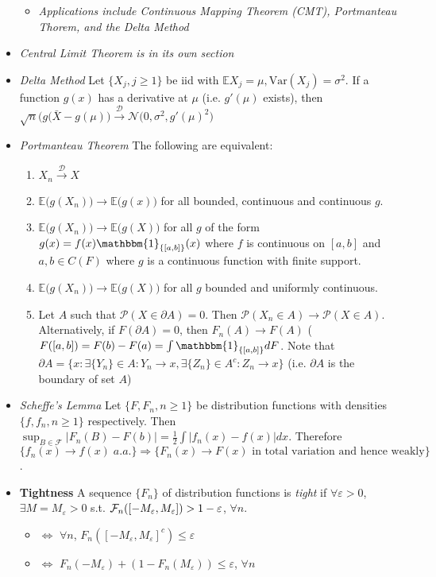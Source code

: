 \documentclass[11pt]{article}
\newcommand{\var}{\mrm{Var}}
\renewcommand{\P}{\mathbb{P}}
\newcommand{\fcal}{\mathcal{F}}
\newcommand{\ncal}{\mathcal{N}}
\newcommand{\F}{{\cal F}}
\newcommand{\eps}{\varepsilon}
\newcommand{\gs}{\sigma}
\newcommand{\mrm}{\mathrm}
\newcommand\abs[1]{\left|#1\right|}
\newcommand{\ind}[1]{\mathbbm{1}_{\{#1\}}}
\renewcommand{\to}{\longrightarrow}
\newcommand{\dto}{\overset{\mathcal{D}}{\to}}
\renewcommand{\P}{\mathcal{P}}
\newcommand{\E}{\mathbb{E}}
\newcommand{\bigpar}[1]{\big( #1 \big)}
\newcommand{\imp}{\Rightarrow}
\newcommand{\gm}{\mu}
\newcommand{\seq}[1]{\{#1\}}
\begin{document}
\begin{multicols}{2}
\begin{itemize}
\begin{itemize}
\item \textit{Applications include Continuous Mapping Theorem (CMT), Portmanteau Thorem, and the Delta Method}
\end{itemize}
\item \textit{Central Limit Theorem is in its own section}
\item \textit{Delta Method} Let $\seq{X_j, j \geq 1}$ be iid with $\E X_j =\gm, \var(X_j) =\gs^2$.  If a function $g(x)$ has a derivative at $\gm$ (i.e. $g'(\gm)$ exists), then $\sqrt{n}\big(g(\bar{X}-g(\gm)\big) \dto \ncal\big(0,\gs^2,g'(\gm)^2\big)$
\item \textit{Portmanteau Theorem} The following are equivalent:
\begin{enumerate}
\item $X_n \dto X$
\item $\E\big(g(X_n)\big) \to \E\big(g(x)\big)$ for all bounded, continuous and continuous $g$.
\item $\E \bigpar{g(X_n)} \to \E\bigpar{g(X)}$ for all $g$ of the form $g(x)=f(x)\ind{[a,b]}(x)$ where $f$ is continuous on $[a,b]$ and $a,b \in C(F)$ where $g$ is a continuous function with finite support.
\item $\E \bigpar{g(X_n)} \to \E \bigpar{g(X)}$ for all $g$ bounded and uniformly continuous.
\item Let $A$ such that $\P(X\in \partial A)=0$. Then $\P(X_n \in A) \to \P(X \in A)$.  Alternatively, if $F(\partial A)=0$, then $F_n(A) \to F(A)$ ($F([a,b])=F(b)-F(a)=\int \ind{[a,b]}dF$. Note that $\partial A=\seq{x: \exists \seq{Y_n} \in A: Y_n \to x, \exists \seq{Z_n}\in A^c: Z_n \to x}$ (i.e. $\partial A$ is the boundary of set $A$)
\end{enumerate}
\item \textit{Scheffe's Lemma} Let $\seq{F,F_n,n \geq 1}$ be distribution functions with densities $\seq{f,f_n,n \geq 1}$ respectively.  Then $\sup_{B \in \fcal} \abs{F_n(B)-F(b)}=\frac{1}{2}\int \abs{f_n(x)-f(x)} dx$.  Therefore $\seq{f_n(x) \to f(x) \; a.a.} \imp \seq{F_n(x) \to F(x) \textrm{ in total variation and hence weakly}}$. 
\item \textbf{Tightness} A sequence $\seq{F_n}$ of distribution functions is \textit{tight} if $\forall \eps>0$, $\exists M=M_{\eps}>0$ s.t. $\F_n([-M_{\eps},M_{\eps}])>1-\eps$, $\forall n$.
\begin{itemize}
\item $\iff$ $\forall n$, $F_n([-M_{\eps},M_{\eps}]^c) \leq \eps$
\item $\iff$ $F_n(-M_{\eps}) + (1-F_n(M_{\eps}))\leq \eps$, $\forall n$

\end{itemize}
\end{itemize}
\end{multicols}
\end{document}
